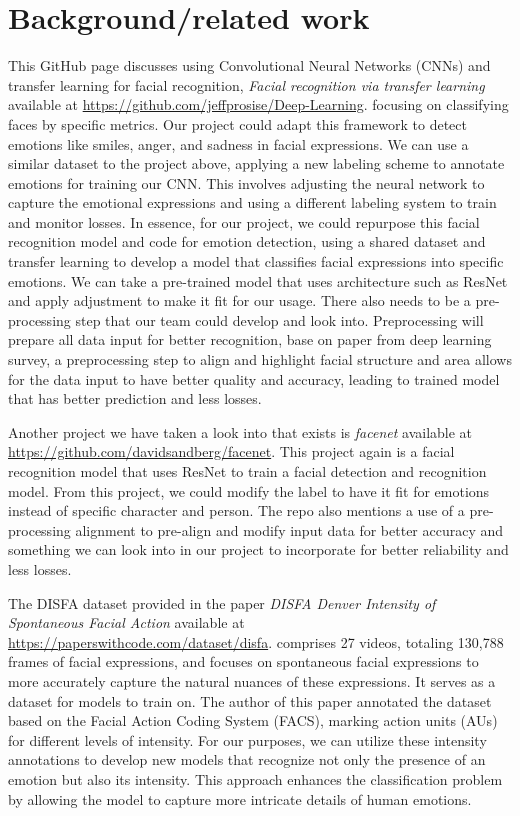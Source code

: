 \documentclass{article} %
\begin{document}
\section{Background/related work}

This GitHub page discusses using Convolutional Neural Networks (CNNs) and transfer learning for facial recognition, 
\textit{Facial recognition via transfer learning} \cite{Jeffprosise} available at
\url{https://github.com/jeffprosise/Deep-Learning}. 
focusing on classifying faces by specific metrics. Our project could adapt this framework to detect emotions like smiles, anger, and sadness in facial expressions. We can use a similar dataset to the project above, applying a new labeling scheme to annotate emotions for training our CNN.  This involves adjusting the neural network to capture the emotional expressions and using a different labeling system to train and monitor losses. In essence, for our project, we could repurpose this facial recognition model and code for emotion detection, using a shared dataset and transfer learning to develop a model that classifies facial expressions into specific emotions. We can take a pre-trained model that uses architecture such as ResNet and apply adjustment to make it fit for our usage. There also needs to be a pre-processing step that our team could develop and look into. Preprocessing will  prepare all data input for better recognition, base on paper from deep learning survey, a preprocessing step to align and highlight facial structure and area allows for the data input to have better quality and accuracy, leading to trained model that has better prediction and less losses.

Another project we have taken a look into that exists is 
\textit{facenet} \citet{Davidsandberg18} available at
\url{https://github.com/davidsandberg/facenet}.
 This project again is a facial recognition model that uses ResNet to train a facial detection and recognition model. From this project, we could modify the label to have it fit for emotions instead of specific character and person. The repo also mentions a use of a pre-processing alignment to pre-align and modify input data for better accuracy and something we can look into in our project to incorporate for better reliability and less losses.

The DISFA dataset provided in the paper 
\textit{DISFA Denver Intensity of Spontaneous Facial Action} \cite{SeyedMohammad} available at
\url{https://paperswithcode.com/dataset/disfa}. 
comprises 27 videos, totaling 130,788 frames of facial expressions, and focuses on spontaneous facial expressions to more accurately capture the natural nuances of these expressions. It serves as a dataset for models to train on. The author of this paper annotated the dataset based on the Facial Action Coding System (FACS), marking action units (AUs) for different levels of intensity. For our purposes, we can utilize these intensity annotations to develop new models that recognize not only the presence of an emotion but also its intensity. This approach enhances the classification problem by allowing the model to capture more intricate details of human emotions.
\end{document}
